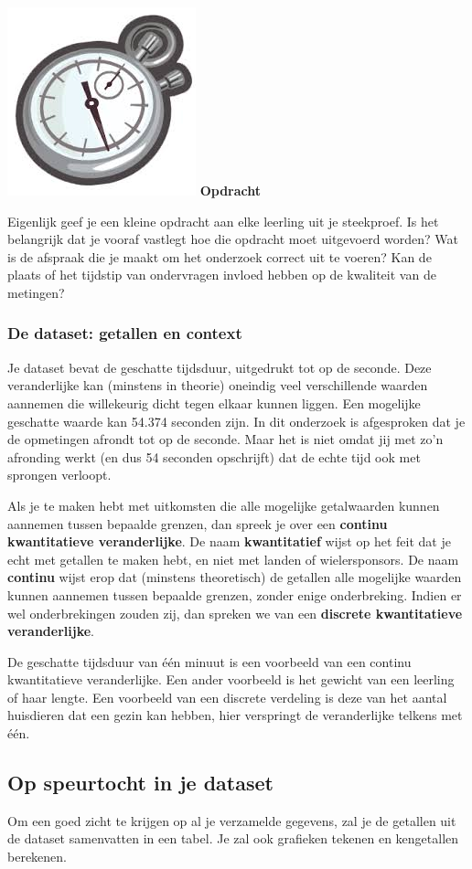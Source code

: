 \documentclass[12pt,twoside]{article}
\newcounter{nstopdracht}
\newenvironment{stopdracht}
{
  \stepcounter{nstopdracht}
  \vspace*{-0.25cm}
  \begin{minipage}{\textwidth}
  {%
  \hspace*{-0.85\marginparwidth}\includegraphics[width=0.75\marginparwidth]{stopwatch}
  \large\bf Opdracht \arabic{nstopdracht}}
}{%
  \end{minipage}
}
\begin{document}
\begin{stopdracht}
Eigenlijk geef je een kleine opdracht aan elke leerling uit je steekproef. Is het belangrijk dat
je vooraf vastlegt hoe die opdracht moet uitgevoerd worden? Wat is de afspraak die je maakt
om het onderzoek correct uit te voeren? Kan de plaats of het tijdstip van ondervragen
invloed hebben op de kwaliteit van de metingen?
\end{stopdracht}

\subsubsection{De dataset: getallen en context}

Je dataset bevat de geschatte tijdsduur, uitgedrukt tot op de seconde. Deze veranderlijke kan
(minstens in theorie) oneindig veel verschillende waarden aannemen die willekeurig dicht tegen
elkaar kunnen liggen. Een mogelijke geschatte waarde kan 54.374 seconden zijn. In dit onderzoek is
afgesproken dat je de opmetingen afrondt tot op de seconde. Maar het is niet omdat jij met zo’n
afronding werkt (en dus 54 seconden opschrijft) dat de echte tijd ook met sprongen verloopt.

Als je te maken hebt met uitkomsten die alle mogelijke getalwaarden kunnen aannemen tussen
bepaalde grenzen, dan spreek je over een {\bf continu kwantitatieve veranderlijke}. De
naam {\bf kwantitatief} wijst op het feit dat je echt met getallen te maken hebt, en niet met landen of
wielersponsors. De naam {\bf continu} wijst erop dat (minstens theoretisch) de getallen alle mogelijke
waarden kunnen aannemen tussen bepaalde grenzen, zonder enige onderbreking. Indien er wel onderbrekingen zouden zij, dan spreken we van een {\bf discrete kwantitatieve veranderlijke}.

De geschatte tijdsduur van één minuut is een voorbeeld van een continu kwantitatieve veranderlijke.
Een ander voorbeeld is het gewicht van een leerling of haar lengte.  Een voorbeeld van een discrete verdeling is deze van het aantal huisdieren dat een gezin kan hebben, hier verspringt de veranderlijke telkens met één.

\subsection{Op speurtocht in je dataset}

Om een goed zicht te krijgen op al je verzamelde gegevens, zal je de
getallen uit de dataset samenvatten in een tabel. Je zal ook grafieken
tekenen en kengetallen berekenen.
\end{document}
